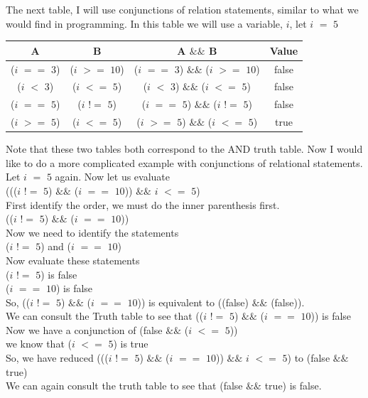 \documentclass[11]{article}
\begin{document}
The next table, I will use conjunctions of relation statements, similar to what we would find in programming. In this table we will use a variable, $i$, let $i$ $=$ $5$

\begin{center}
  \begin{tabular}{ | c | c | c | c |}
    \hline
    A & B & A $\&\&$ B & Value\\ \hline
    ($i$ $==$ $3$) & ($i$ $>=$ $10$) & ($i$ $==$ $3$) $\&\&$ ($i$ $>=$ $10$) & false \\ \hline
    ($i$ $<$ $3$) & ($i$ $<=$ $5$) & ($i$ $<$ $3$) $\&\&$ ($i$ $<=$ $5$) & false \\ \hline
    ($i$ $==$ $5$) & ($i$ $!=$ $5$) &  ($i$ $==$ $5$) $\&\&$ ($i$ $!=$ $5$)& false \\ \hline
    ($i$ $>=$ $5$) & ($i$ $<=$ $5$) & ($i$ $>=$ $5$) $\&\&$ ($i$ $<=$ $5$) & true \\
    \hline
  \end{tabular}
\end{center}

Note that these two tables both correspond to the AND truth table. Now I would like to do a more complicated example with conjunctions of relational statements. Let $i$ $=$ $5$ again. Now let us evaluate\\ ((($i$ $!=$ $5$) $\&\&$ ($i$ $==$ $10$)) $\&\&$ $i$ $<=$ $5$)\\

First identify the order, we must do the inner parenthesis first.\\
(($i$ $!=$ $5$) $\&\&$ ($i$ $==$ $10$))\\
Now we need to identify the statements\\
($i$ $!=$ $5$) and ($i$ $==$ $10$) \\
Now evaluate these statements \\
($i$ $!=$ $5$) is false\\
 ($i$ $==$ $10$) is false \\
 So, (($i$ $!=$ $5$) $\&\&$ ($i$ $==$ $10$)) is equivalent to ((false) $\&\&$ (false)).\\
 We can consult the Truth table to see that (($i$ $!=$ $5$) $\&\&$ ($i$ $==$ $10$)) is false\\
 
 Now we have a conjunction of (false $\&\&$ ($i$ $<=$ $5$))\\
 we know that ($i$ $<=$ $5$) is true \\
 So, we have reduced ((($i$ $!=$ $5$) $\&\&$ ($i$ $==$ $10$)) $\&\&$ $i$ $<=$ $5$) to (false $\&\&$ true)\\
 We can again consult the truth table to see that (false $\&\&$ true) is false.\\
 
\end{document}
